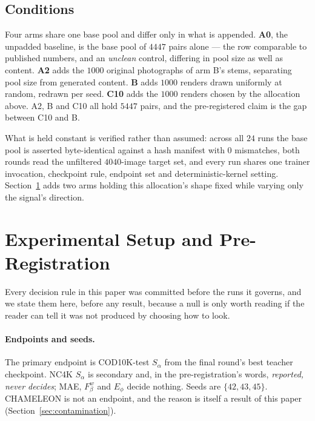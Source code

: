 \documentclass{article} %
\begin{document}
\subsection{Conditions}
\label{sec:method-arms}

Four arms share one base pool and differ only in what is appended. \textbf{A0}, the unpadded baseline,
is the base pool of $4447$ pairs alone --- the row comparable to published numbers, and an
\emph{unclean} control, differing in pool size as well as content. \textbf{A2} adds the $1000$ original
photographs of arm B's stems, separating pool size from generated content. \textbf{B} adds $1000$
renders drawn uniformly at random, redrawn per seed. \textbf{C10} adds the $1000$ renders chosen by the
allocation above. A2, B and C10 all hold $5447$ pairs, and the pre-registered claim is the gap between
C10 and B.

What is held constant is verified rather than assumed: across all $24$ runs the base pool is asserted
byte-identical against a hash manifest with $0$ mismatches, both rounds read the unfiltered
$4040$-image target set, and every run shares one trainer invocation, checkpoint rule, endpoint set and
deterministic-kernel setting. Section~\ref{sec:setup} adds two arms holding this allocation's shape
fixed while varying only the signal's direction.

\section{Experimental Setup and Pre-Registration}
\label{sec:setup}

Every decision rule in this paper was committed before the runs it governs, and we state them here,
before any result, because a null is only worth reading if the reader can tell it was not produced by
choosing how to look.

\paragraph{Endpoints and seeds.} The primary endpoint is COD10K-test $S_\alpha$ from the final
round's best teacher checkpoint. NC4K $S_\alpha$ is secondary and, in the pre-registration's words,
\emph{reported, never decides}; MAE, $F_\beta^w$ and $E_\phi$ decide nothing. Seeds are
$\{42,43,45\}$. CHAMELEON is not an endpoint, and the reason is itself a result of this paper
(Section~\ref{sec:contamination}).
\end{document}
